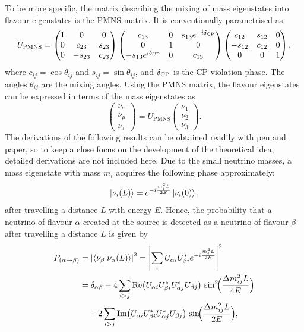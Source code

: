 To be more specific, the matrix describing the mixing of mass eigenstates into flavour eigenstates is the PMNS matrix.
It is conventionally parametrised as 
\begin{equation}
U_{\text{PMNS}} = 
\begin{pmatrix}
1 & 0 & 0 \\
0 & c_{23} & s_{23} \\
0 & -s_{23} & c_{23}
\end{pmatrix}
\begin{pmatrix}
c_{13} & 0 & s_{13} e^{-i\delta_\textrm{CP}} \\
0 & 1 & 0 \\
-s_{13} e^{i\delta_\textrm{CP}} & 0 & c_{13}
\end{pmatrix}
\begin{pmatrix}
c_{12} & s_{12} & 0 \\
-s_{12} & c_{12} & 0 \\
0 & 0 & 1
\end{pmatrix},
\end{equation}
where $c_{ij} = \cos\theta_{ij}$ and $s_{ij} = \sin\theta_{ij}$, and $\delta_\textrm{CP}$ is the CP violation phase.
The angles $\theta_{ij}$ are the mixing angles. 
Using the PMNS matrix, the flavour eigenstates can be expressed in terms of the mass eigenstates as 
\begin{equation}
\begin{pmatrix}
\nu_e \\
\nu_\mu \\
\nu_\tau
\end{pmatrix}
=
U_{\text{PMNS}}
\begin{pmatrix}
\nu_1 \\
\nu_2 \\
\nu_3
\end{pmatrix}.
\end{equation}
The derivations of the following results can be obtained readily with pen and paper, so 
to keep a close focus on the development of the theoretical idea, detailed derivations are not included here. 
Due to the small neutrino masses, a mass eigenstate with mass $m_i$ acquires the following phase approximately:
\begin{equation}
  \ket{\nu_i(L)} = e^{-i \frac{m_i^2 L}{2E}} \ket{\nu_i(0)},
\end{equation}
after travelling a distance $L$ with energy $E$.
Hence, the probability that a neutrino of flavour $\alpha$ created at the source is detected as a neutrino of flavour $\beta$ after travelling a distance $L$ is given by
\begin{align}
  P_{(\alpha \to \beta)} &= \left|\braket{\nu_\beta | \nu_\alpha(L)} \right|^2 = \left| \sum_i U_{\alpha i} U^*_{\beta i} e^{-i \frac{m_i^2 L}{2E}} \right|^2 \\
  &= \delta_{\alpha\beta} - 4 \sum_{i>j} \text{Re} \bigl( U_{\alpha i} U^*_{\beta i} U^*_{\alpha j} U_{\beta j} \bigr) \,\sin^2 \!\Bigl( \frac{\Delta m^2_{ij} L}{4E} \Bigr) \\
  &\quad + 2 \sum_{i>j} \text{Im} \bigl( U_{\alpha i} U^*_{\beta i} U^*_{\alpha j} U_{\beta j} \bigr) \,\sin \!\Bigl( \frac{\Delta m^2_{ij} L}{2E} \Bigr),
\end{align}
